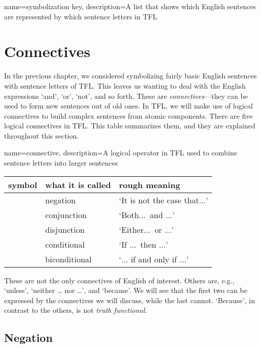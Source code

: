 {
name=symbolization key,
description={A list that shows which English sentences are represented by which \glspl{sentence letter} in TFL}
}

\chapter{Connectives}
\label{s:TFLConnectives}

In the previous chapter, we considered symbolizing fairly basic English sentences with sentence letters of TFL. This leaves us wanting to deal with the English expressions `and', `or', `not', and so forth. These are \emph{connectives}---they can be used to form new sentences out of old ones. In TFL, we will make use of logical connectives to build complex sentences from atomic components. There are five logical connectives in TFL. This table summarizes them, and they are explained throughout this section.

{
name=connective,
description={A logical operator in TFL used to combine \glspl{sentence letter} into larger sentences}
}
	\begin{table}[h]
	\center
	\begin{tabular}{l l l}
	
	\textbf{symbol}&\textbf{what it is called}&\textbf{rough meaning}\\
	\hline
	\enot&negation&`It is not the case that$\ldots$'\\
	\eand&conjunction&`Both$\ldots$\ and $\ldots$'\\
	\eor&disjunction&`Either$\ldots$\ or $\ldots$'\\
	\eif&conditional&`If $\ldots$\ then $\ldots$'\\
	\eiff&biconditional&`$\ldots$ if and only if $\ldots$'\\
	
	\end{tabular}
	\end{table}

These are not the only connectives of English of interest. Others are, e.g., `unless', `neither \dots{} nor \dots', and `because'. We will see that the first two can be expressed by the connectives we will discuss, while the last cannot. `Because', in contrast to the others, is not \emph{truth functional}.

        
\section{Negation}

